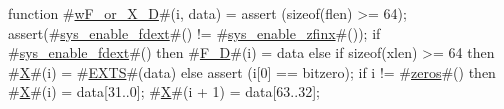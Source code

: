 function #\hyperref[sailRISCVzwFzyorzyXzyD]{wF\_or\_X\_D}#(i, data) = {
  assert (sizeof(flen) >= 64);
  assert(#\hyperref[sailRISCVzsyszyenablezyfdext]{sys\_enable\_fdext}#() != #\hyperref[sailRISCVzsyszyenablezyzzfinx]{sys\_enable\_zfinx}#());
  if   #\hyperref[sailRISCVzsyszyenablezyfdext]{sys\_enable\_fdext}#()
  then #\hyperref[sailRISCVzFzyD]{F\_D}#(i) = data
  else if sizeof(xlen) >= 64
  then #\hyperref[sailRISCVzX]{X}#(i) = #\hyperref[sailRISCVzEXTS]{EXTS}#(data)
  else {
    assert (i[0] == bitzero);
    if i != #\hyperref[sailRISCVzzzeros]{zeros}#() then {
      #\hyperref[sailRISCVzX]{X}#(i)     = data[31..0];
      #\hyperref[sailRISCVzX]{X}#(i + 1) = data[63..32];
    }
  }
}
